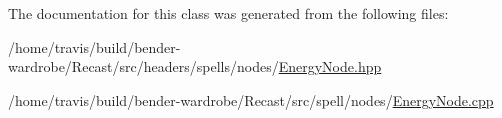 The documentation for this class was generated from the following files\-:\begin{DoxyCompactItemize}
\item 
/home/travis/build/bender-\/wardrobe/\-Recast/src/headers/spells/nodes/\hyperlink{_energy_node_8hpp}{Energy\-Node.\-hpp}\item 
/home/travis/build/bender-\/wardrobe/\-Recast/src/spell/nodes/\hyperlink{_energy_node_8cpp}{Energy\-Node.\-cpp}\end{DoxyCompactItemize}
